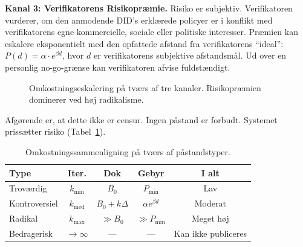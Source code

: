 \documentclass[11pt,a4paper,twocolumn]{article}
\begin{document}
\textbf{Kanal 3: Verifikatorens Risikopræmie.} Risiko er subjektiv. Verifikatoren vurderer, om den anmodende DID's erklærede policyer er i konflikt med verifikatorens egne kommercielle, sociale eller politiske interesser. Præmien kan eskalere eksponentielt med den opfattede afstand fra verifikatorens ``ideal'': $P(d) = \alpha \cdot e^{\beta d}$, hvor $d$ er verifikatorens subjektive afstandsmål. Ud over en personlig no-go-grænse kan verifikatoren afvise fuldstændigt.

\begin{figure}[ht]
\centering
{}
\caption{Omkostningseskalering på tværs af tre kanaler. Risikopræmien dominerer ved høj radikalisme.}
\label{fig:radicalism}
\end{figure}

Afgørende er, at dette ikke er censur. Ingen påstand er forbudt. Systemet prissætter risiko (Tabel~\ref{tab:costs}).

\begin{table}[ht]
\centering
\caption{Omkostningssammenligning på tværs af påstandstyper.}
\label{tab:costs}
\footnotesize
\begin{tabular}{@{}lcccc@{}}
\toprule
\textbf{Type} & \textbf{Iter.} & \textbf{Dok} & \textbf{Gebyr} & \textbf{I alt} \\
\midrule
Troværdig & $k_{\min}$ & $B_0$ & $P_{\min}$ & Lav \\
Kontroversiel & $k_{\text{med}}$ & $B_0{+}k\Delta$ & $\alpha e^{\beta d}$ & Moderat \\
Radikal & $k_{\max}$ & $\gg B_0$ & $\gg P_{\min}$ & Meget høj \\
Bedragerisk & $\to\infty$ & --- & --- & Kan ikke publiceres \\
\bottomrule
\end{tabular}
\end{table}
\end{document}
